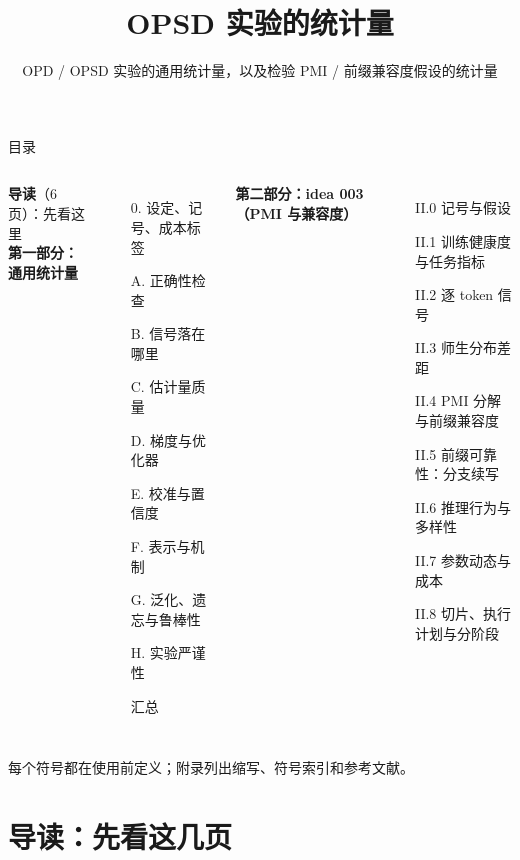 \documentclass[aspectratio=169,11pt]{beamer}
\title{OPSD 实验的统计量}
\subtitle{OPD / OPSD 实验的通用统计量，以及检验 PMI / 前缀兼容度假设的统计量}
\author{}
\date{}
\newcommand{\gnote}[1]{{\scriptsize\color{cGray}#1}}
\begin{document}
\maketitle

\begin{frame}{目录}
\begin{columns}[T]
\textbf{导读}（6 页）：先看这里\\[3pt]
\textbf{第一部分：通用统计量}\\[2pt]
\small
\begin{enumerate}
  \setlength\itemsep{-1pt}
  \item[0.] 设定、记号、成本标签
  \item[A.] 正确性检查
  \item[B.] 信号落在哪里
  \item[C.] 估计量质量
  \item[D.] 梯度与优化器
  \item[E.] 校准与置信度
  \item[F.] 表示与机制
  \item[G.] 泛化、遗忘与鲁棒性
  \item[H.] 实验严谨性
  \item[] 汇总
\end{enumerate}
\textbf{第二部分：idea 003（PMI 与兼容度）}\\[2pt]
\small
\begin{enumerate}
  \setlength\itemsep{-1pt}
  \item[II.0] 记号与假设
  \item[II.1] 训练健康度与任务指标
  \item[II.2] 逐 token 信号
  \item[II.3] 师生分布差距
  \item[II.4] PMI 分解与前缀兼容度
  \item[II.5] 前缀可靠性：分支续写
  \item[II.6] 推理行为与多样性
  \item[II.7] 参数动态与成本
  \item[II.8] 切片、执行计划与分阶段
\end{enumerate}
\end{columns}
\gnote{每个符号都在使用前定义；附录列出缩写、符号索引和参考文献。}
\end{frame}

\section{导读：先看这几页}
\end{document}
